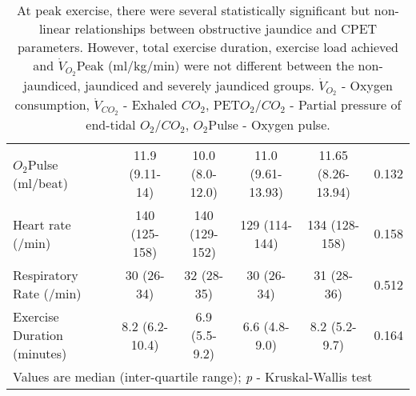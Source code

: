 \begin{sidewaystable}[p]
\begin{tabular}{|l| c c c c c|}
		$O_2$Pulse (ml/beat)           & 11.9 (9.11-14)    & 10.0 (8.0-12.0)   & 11.0 (9.61-13.93) & 11.65 (8.26-13.94) & 0.132      \\
		Heart rate (/min)              & 140 (125-158)     & 140 (129-152)     & 129 (114-144)     & 134 (128-158)      & 0.158      \\
		Respiratory Rate (/min)        & 30 (26-34)        & 32 (28-35)        & 30 (26-34)        & 31 (28-36)         & 0.512      \\
		Exercise Duration (minutes)    & 8.2 (6.2-10.4)    & 6.9 (5.5-9.2)     & 6.6 (4.8-9.0)     & 8.2 (5.2-9.7)      & 0.164      \\ \hline
		\multicolumn{6}{l}{Values are median (inter-quartile range); \textit{p} - Kruskal-Wallis test}
	\end{tabular}
	\medskip
	\caption*{At peak exercise, there were several statistically significant but non-linear relationships between obstructive jaundice and CPET parameters. However, total exercise duration, exercise load achieved and $\dot{V}_{O_2}$Peak (ml/kg/min) were not different between the non-jaundiced, jaundiced and severely jaundiced groups. $\dot{V}_{O_2}$ - Oxygen consumption, $\dot{V}_{CO_2}$ - Exhaled $CO_2$, PET$O_2$/$CO_2$ - Partial pressure of end-tidal $O_2$/$CO_2$, $O_2$Pulse - Oxygen pulse.}
\end{sidewaystable}

